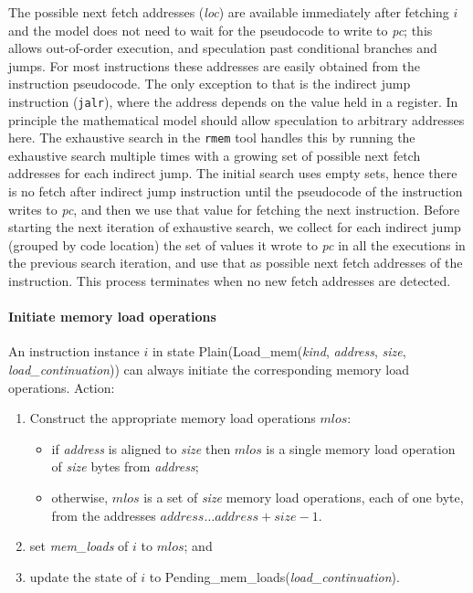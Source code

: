 \begin{commentary}
The possible next fetch addresses ({\it loc}) are available immediately after fetching $i$ and the model does not need to wait for the pseudocode to write to {\em pc}; this allows out-of-order execution, and speculation past conditional branches and jumps.
For most instructions these addresses are easily obtained from the instruction pseudocode.
The only exception to that is the indirect jump instruction ({\tt jalr}), where the address depends on the value held in a register.
%
In principle the mathematical model should allow speculation to
arbitrary addresses here. 
%
The exhaustive search in the {\tt rmem} tool handles this by running the exhaustive search multiple times with a growing set of possible next fetch addresses for each indirect jump.
The initial search uses empty sets, hence there is no fetch after indirect jump instruction until the pseudocode of the instruction writes to {\em pc}, and then we use that value for fetching the next instruction.
Before starting the next iteration of exhaustive search, we collect for each indirect jump (grouped by code location) the set of values it wrote to {\em pc} in all the executions in the previous search iteration, and use that as possible next fetch addresses of the instruction.
This process terminates when no new fetch addresses are detected.
\end{commentary}

\paragraph{Initiate memory load operations}\label{omm:initiate_load}
An instruction instance $i$ in state {\sc Plain}({\sc Load\_mem}({\it kind}, {\it address}, {\it size}, {\it load\_continuation})) can always initiate the corresponding memory load operations.
Action:
\begin{enumerate}
\item Construct the appropriate memory load operations $mlos$:
  \begin{itemize}
  \item if {\it address} is aligned to {\it size} then $mlos$ is a single memory load operation of {\it size} bytes from {\it address};
  \item otherwise, $mlos$ is a set of {\it size} memory load operations, each of one byte, from the addresses $\textit{address}\ldots\textit{address}+\textit{size}-1$.
  \end{itemize}
\item set {\it mem\_loads} of $i$ to $mlos$; and
\item update the state of $i$ to {\sc Pending\_mem\_loads}({\it load\_continuation}).
\end{enumerate}

